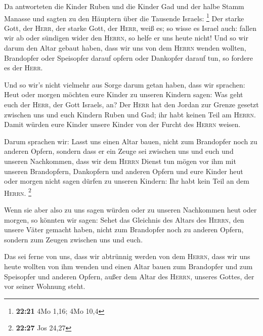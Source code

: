  Da antworteten die Kinder Ruben und die Kinder Gad und
der halbe Stamm Manasse und sagten zu den Häuptern über die Tausende
Israels: \footnote{\textbf{22:21} 4Mo 1,16; 4Mo 10,4} 
Der starke Gott, der \textsc{Herr}, der starke Gott, der \textsc{Herr},
weiß es; so wisse es Israel auch: fallen wir ab oder sündigen wider den
\textsc{Herrn}, so helfe er uns heute nicht!  Und so wir
darum den Altar gebaut haben, dass wir uns von dem \textsc{Herrn} wenden
wollten, Brandopfer oder Speisopfer darauf opfern oder Dankopfer darauf
tun, so fordere es der \textsc{Herr}.

 Und so wir's nicht vielmehr aus Sorge darum getan haben,
dass wir sprachen: Heut oder morgen möchten eure Kinder zu unseren
Kindern sagen: Was geht euch der \textsc{Herr}, der Gott Israels, an?
 Der \textsc{Herr} hat den Jordan zur Grenze gesetzt
zwischen uns und euch Kindern Ruben und Gad; ihr habt keinen Teil am
\textsc{Herrn}. Damit würden eure Kinder unsere Kinder von der Furcht
des \textsc{Herrn} weisen.

 Darum sprachen wir: Lasst uns einen Altar bauen, nicht
zum Brandopfer noch zu anderen Opfern,  sondern dass er
ein Zeuge sei zwischen uns und euch und unseren Nachkommen, dass wir dem
\textsc{Herrn} Dienst tun mögen vor ihm mit unseren Brandopfern,
Dankopfern und anderen Opfern und eure Kinder heut oder morgen nicht
sagen dürfen zu unseren Kindern: Ihr habt kein Teil an dem
\textsc{Herrn}. \footnote{\textbf{22:27} Jos 24,27}

 Wenn sie aber also zu uns sagen würden oder zu unseren
Nachkommen heut oder morgen, so könnten wir sagen: Sehet das Gleichnis
des Altars des \textsc{Herrn}, den unsere Väter gemacht haben, nicht zum
Brandopfer noch zu anderen Opfern, sondern zum Zeugen zwischen uns und
euch.

 Das sei ferne von uns, dass wir abtrünnig werden von dem
\textsc{Herrn}, dass wir uns heute wollten von ihm wenden und einen
Altar bauen zum Brandopfer und zum Speisopfer und anderen Opfern, außer
dem Altar des \textsc{Herrn}, unseres Gottes, der vor seiner Wohnung
steht.

